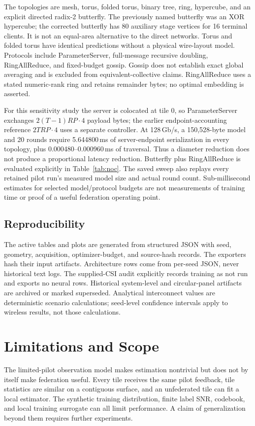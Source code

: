\documentclass[journal]{IEEEtran}
\begin{document}
The topologies are mesh, torus, folded torus, binary tree, ring, hypercube, and an explicit directed radix-2 butterfly. The previously named butterfly was an XOR hypercube; the corrected butterfly has 80 auxiliary stage vertices for 16 terminal clients. It is not an equal-area alternative to the direct networks. Torus and folded torus have identical predictions without a physical wire-layout model. Protocols include ParameterServer, full-message recursive doubling, RingAllReduce, and fixed-budget gossip. Gossip does not establish exact global averaging and is excluded from equivalent-collective claims. RingAllReduce uses a stated numeric-rank ring and retains remainder bytes; no optimal embedding is asserted.

For this sensitivity study the server is colocated at tile 0, so ParameterServer exchanges $2(T-1)RP\cdot4$ payload bytes; the earlier endpoint-accounting reference $2TRP\cdot4$ uses a separate controller. At 128\,Gb/s, a 150,528-byte model and 20 rounds require 5.644800\,ms of server-endpoint serialization in every topology, plus 0.000480--0.000960\,ms of traversal. Thus a diameter reduction does not produce a proportional latency reduction. Butterfly plus RingAllReduce is evaluated explicitly in Table~\ref{tab:noc}. The saved sweep also replays every retained pilot run's measured model size and actual round count. Sub-millisecond estimates for selected model/protocol budgets are not measurements of training time or proof of a useful federation operating point.


\subsection{Reproducibility}
The active tables and plots are generated from structured JSON with seed, geometry, acquisition, optimizer-budget, and source-hash records. The exporters hash their input artifacts. Architecture rows come from per-seed JSON, never historical text logs. The supplied-CSI audit explicitly records training as not run and exports no neural rows. Historical system-level and circular-panel artifacts are archived or marked superseded. Analytical interconnect values are deterministic scenario calculations; seed-level confidence intervals apply to wireless results, not those calculations.

\section{Limitations and Scope}
The limited-pilot observation model makes estimation nontrivial but does not by itself make federation useful. Every tile receives the same pilot feedback, tile statistics are similar on a contiguous surface, and an unfederated tile can fit a local estimator. The synthetic training distribution, finite label SNR, codebook, and local training surrogate can all limit performance. A claim of generalization beyond them requires further experiments.
\end{document}
